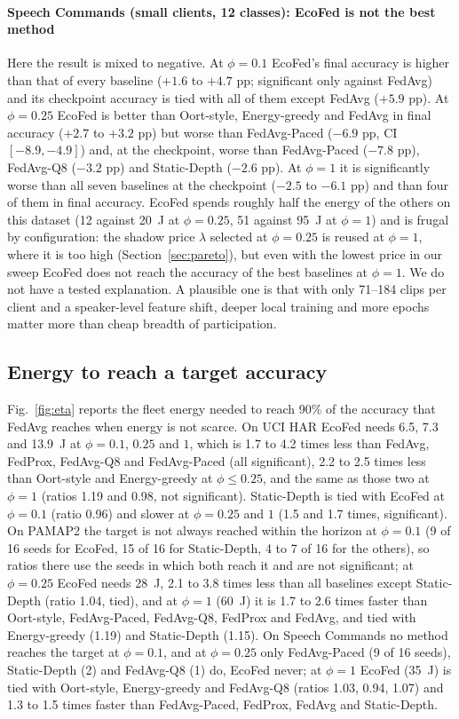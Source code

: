 \paragraph{Speech Commands (small clients, 12 classes): EcoFed is not the best method}
Here the result is mixed to negative. At $\phi=0.1$ EcoFed's final accuracy is higher than that of every baseline ($+1.6$ to $+4.7$ pp; significant only against FedAvg) and its checkpoint accuracy is tied with all of them except FedAvg ($+5.9$ pp). At $\phi=0.25$ EcoFed is better than Oort-style, Energy-greedy and FedAvg in final accuracy ($+2.7$ to $+3.2$ pp) but worse than FedAvg-Paced ($-6.9$ pp, CI $[-8.9,-4.9]$) and, at the checkpoint, worse than FedAvg-Paced ($-7.8$ pp), FedAvg-Q8 ($-3.2$ pp) and Static-Depth ($-2.6$ pp). At $\phi=1$ it is significantly worse than all seven baselines at the checkpoint ($-2.5$ to $-6.1$ pp) and than four of them in final accuracy. EcoFed spends roughly half the energy of the others on this dataset (12 against 20~J at $\phi=0.25$, 51 against 95~J at $\phi=1$) and is frugal by configuration: the shadow price $\lambda$ selected at $\phi=0.25$ is reused at $\phi=1$, where it is too high (Section~\ref{sec:pareto}), but even with the lowest price in our sweep EcoFed does not reach the accuracy of the best baselines at $\phi=1$. We do not have a tested explanation. A plausible one is that with only 71--184 clips per client and a speaker-level feature shift, deeper local training and more epochs matter more than cheap breadth of participation.

\subsection{Energy to reach a target accuracy}
Fig.~\ref{fig:eta} reports the fleet energy needed to reach 90\% of the accuracy that FedAvg reaches when energy is not scarce. On UCI HAR EcoFed needs 6.5, 7.3 and 13.9~J at $\phi=0.1$, $0.25$ and $1$, which is 1.7 to 4.2 times less than FedAvg, FedProx, FedAvg-Q8 and FedAvg-Paced (all significant), 2.2 to 2.5 times less than Oort-style and Energy-greedy at $\phi\le0.25$, and the same as those two at $\phi=1$ (ratios 1.19 and 0.98, not significant). Static-Depth is tied with EcoFed at $\phi=0.1$ (ratio 0.96) and slower at $\phi=0.25$ and $1$ (1.5 and 1.7 times, significant). On PAMAP2 the target is not always reached within the horizon at $\phi=0.1$ (9 of 16 seeds for EcoFed, 15 of 16 for Static-Depth, 4 to 7 of 16 for the others), so ratios there use the seeds in which both reach it and are not significant; at $\phi=0.25$ EcoFed needs 28~J, 2.1 to 3.8 times less than all baselines except Static-Depth (ratio 1.04, tied), and at $\phi=1$ (60~J) it is 1.7 to 2.6 times faster than Oort-style, FedAvg-Paced, FedAvg-Q8, FedProx and FedAvg, and tied with Energy-greedy (1.19) and Static-Depth (1.15). On Speech Commands no method reaches the target at $\phi=0.1$, and at $\phi=0.25$ only FedAvg-Paced (9 of 16 seeds), Static-Depth (2) and FedAvg-Q8 (1) do, EcoFed never; at $\phi=1$ EcoFed (35~J) is tied with Oort-style, Energy-greedy and FedAvg-Q8 (ratios 1.03, 0.94, 1.07) and 1.3 to 1.5 times faster than FedAvg-Paced, FedProx, FedAvg and Static-Depth.

